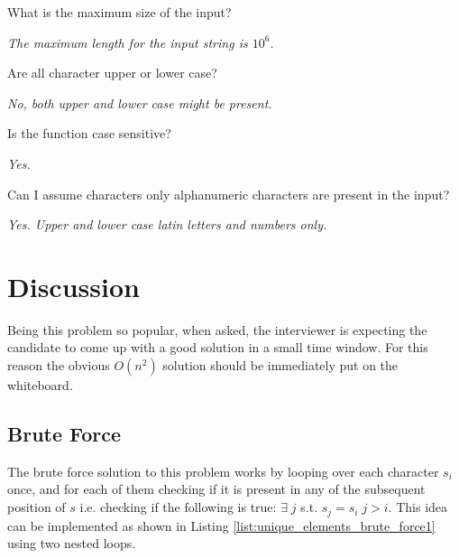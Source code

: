 \begin{QandA}
	\item What is the maximum size of the input?
	\begin{answered}
		\textit{The maximum length for the input string is $10^6$.}
	\end{answered}
	
	\item Are all character upper or lower case?
	\begin{answered}
		\textit{No, both upper and lower case might be present.}
	\end{answered}

	\item Is the function case sensitive?
	\begin{answered}
		\textit{Yes.}
	\end{answered}

	\item Can I assume characters only alphanumeric characters are present in the input?
	\begin{answered}
		\textit{Yes. Upper and lower case latin letters and numbers only.}
	\end{answered}
\end{QandA}

\section{Discussion}
Being this problem so popular, when asked, the interviewer is expecting the candidate to come up with a good solution in a small time window. For this reason the obvious $O(n^2)$ solution should be immediately put on the whiteboard.
\subsection{Brute Force}
The brute force solution to this problem works by looping over each character $s_i$ once, and for each of them checking if it is present in any of the subsequent position of $s$ i.e. checking if the following is true: $\exists \; j $ s.t.  $s_j=s_i \; j>i$.
This idea can be implemented as shown in Listing \ref{list:unique_elements_brute_force1} using two nested loops.

\begin{minipage}{\linewidth}
	
\end{minipage}


